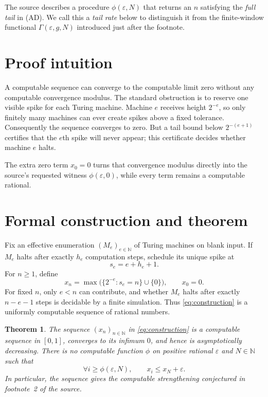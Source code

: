 \documentclass[10pt]{article}
\newtheorem{theorem}{Theorem}
\newcommand{\N}{\mathbb N}
\begin{document}
The source describes a procedure $\phi(\varepsilon,N)$ that returns an $n$
satisfying the \emph{full tail} in (AD).  We call this a \emph{tail rate} below
to distinguish it from the finite-window functional $\Gamma(\varepsilon,g,N)$
introduced just after the footnote.

\section*{Proof intuition}

A computable sequence can converge to the computable limit zero without any
computable convergence modulus.  The standard obstruction is to reserve one
visible spike for each Turing machine.  Machine $e$ receives height $2^{-e}$,
so only finitely many machines can ever create spikes above a fixed tolerance.
Consequently the sequence converges to zero.  But a tail bound below
$2^{-(e+1)}$ certifies that the $e$th spike will never appear; this certificate
decides whether machine $e$ halts.

The extra zero term $x_0=0$ turns that convergence modulus directly into the
source's requested witness $\phi(\varepsilon,0)$, while every term remains a
computable rational.

\section*{Formal construction and theorem}

Fix an effective enumeration $(M_e)_{e\in\N}$ of Turing machines on blank
input.  If $M_e$ halts after exactly $h_e$ computation steps, schedule its
unique spike at
\[
 s_e=e+h_e+1.
\]
For $n\ge1$, define
\begin{equation}\label{eq:construction}
 x_n=\max\bigl(\{2^{-e}:s_e=n\}\cup\{0\}\bigr),
 \qquad x_0=0.
\end{equation}
For fixed $n$, only $e<n$ can contribute, and whether $M_e$ halts after
exactly $n-e-1$ steps is decidable by a finite simulation.  Thus
\eqref{eq:construction} is a
uniformly computable sequence of rational numbers.

\begin{theorem}
The sequence $(x_n)_{n\in\N}$ in \eqref{eq:construction} is a computable sequence in
$[0,1]$, converges to its infimum $0$, and hence is asymptotically decreasing.
There is no computable function $\phi$ on positive rational $\varepsilon$ and
$N\in\N$ such that
\begin{equation}\label{eq:tail}
 \forall i\ge \phi(\varepsilon,N),\qquad
 x_i\le x_N+\varepsilon.
\end{equation}
In particular, the sequence gives the computable strengthening conjectured in
footnote~2 of the source.
\end{theorem}
\end{document}
